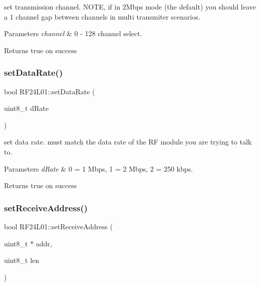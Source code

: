 set transmission channel. N\+O\+TE, if in 2\+Mbps mode (the default) you should leave a 1 channel gap between channels in multi transmiter scenarios. 
\begin{DoxyParams}{Parameters}
{\em channel} & 0 -\/ 128 channel select. \\
\hline
\end{DoxyParams}
\begin{DoxyReturn}{Returns}
true on success 
\end{DoxyReturn}
\mbox{\label{namespace_r_f24_l01_a79791c76ac83ff495c95d03db5d008b7}} 
\subsubsection{\texorpdfstring{set\+Data\+Rate()}{setDataRate()}}
{\footnotesize\ttfamily bool R\+F24\+L01\+::set\+Data\+Rate (\begin{DoxyParamCaption}\item[{uint8\+\_\+t}]{d\+Rate }\end{DoxyParamCaption})}

set data rate. must match the data rate of the RF module you are trying to talk to. 
\begin{DoxyParams}{Parameters}
{\em d\+Rate} & 0 = 1 Mbps, 1 = 2 Mbps, 2 = 250 kbps. \\
\hline
\end{DoxyParams}
\begin{DoxyReturn}{Returns}
true on success 
\end{DoxyReturn}
\mbox{\label{namespace_r_f24_l01_adcaf71ba2ff7a89bb25b727e29a3910e}} 
\subsubsection{\texorpdfstring{set\+Receive\+Address()}{setReceiveAddress()}\hspace{0.1cm}{\footnotesize\ttfamily [1/2]}}
{\footnotesize\ttfamily bool R\+F24\+L01\+::set\+Receive\+Address (\begin{DoxyParamCaption}\item[{uint8\+\_\+t $\ast$}]{addr,  }\item[{uint8\+\_\+t}]{len }\end{DoxyParamCaption})}

